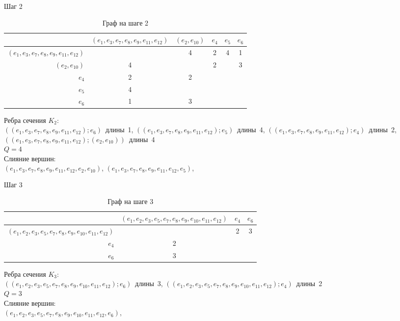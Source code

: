 \documentclass[a4paper,12pt]{article}
\begin{document}
\begin{minipage}{\textwidth}
Шаг 2\\
\begin{table}[H]
\centering
\caption{Граф на шаге 2}
\begin{tabular}{r*{5}{|c}}
&$(e_{1},e_{3},e_{7},e_{8},e_{9},e_{11},e_{12})$&$(e_{2},e_{10})$&$e_{4}$&$e_{5}$&$e_{6}$\\
\hline $(e_{1},e_{3},e_{7},e_{8},e_{9},e_{11},e_{12})$&&4&2&4&1\\
\hline $(e_{2},e_{10})$&4&&2&&3\\
\hline $e_{4}$&2&2&&&\\
\hline $e_{5}$&4&&&&\\
\hline $e_{6}$&1&3&&&\\
\end{tabular}
\end{table}
Ребра сечения $K_{2}$:\\
\mbox{$((e_{1},e_{3},e_{7},e_{8},e_{9},e_{11},e_{12});e_{6})$ длины 1},
\mbox{$((e_{1},e_{3},e_{7},e_{8},e_{9},e_{11},e_{12});e_{5})$ длины 4},
\mbox{$((e_{1},e_{3},e_{7},e_{8},e_{9},e_{11},e_{12});e_{4})$ длины 2},
\mbox{$((e_{1},e_{3},e_{7},e_{8},e_{9},e_{11},e_{12});(e_{2},e_{10}))$ длины 4}\\
$Q=4$\\
Слияние вершин:\\
\mbox{$(e_{1},e_{3},e_{7},e_{8},e_{9},e_{11},e_{12},e_{2},e_{10})$},
\mbox{$(e_{1},e_{3},e_{7},e_{8},e_{9},e_{11},e_{12},e_{5})$},
\end{minipage}
\bigskip
\noindent
\begin{minipage}{\textwidth}
Шаг 3\\
\begin{table}[H]
\centering
\caption{Граф на шаге 3}
\begin{tabular}{r*{3}{|c}}
&$(e_{1},e_{2},e_{3},e_{5},e_{7},e_{8},e_{9},e_{10},e_{11},e_{12})$&$e_{4}$&$e_{6}$\\
\hline $(e_{1},e_{2},e_{3},e_{5},e_{7},e_{8},e_{9},e_{10},e_{11},e_{12})$&&2&3\\
\hline $e_{4}$&2&&\\
\hline $e_{6}$&3&&\\
\end{tabular}
\end{table}
Ребра сечения $K_{3}$:\\
\mbox{$((e_{1},e_{2},e_{3},e_{5},e_{7},e_{8},e_{9},e_{10},e_{11},e_{12});e_{6})$ длины 3},
\mbox{$((e_{1},e_{2},e_{3},e_{5},e_{7},e_{8},e_{9},e_{10},e_{11},e_{12});e_{4})$ длины 2}\\
$Q=3$\\
Слияние вершин:\\
\mbox{$(e_{1},e_{2},e_{3},e_{5},e_{7},e_{8},e_{9},e_{10},e_{11},e_{12},e_{6})$},
\end{minipage}
\end{document}
